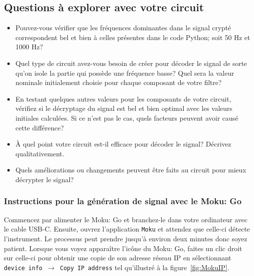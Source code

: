 \documentclass[canadien,12pt,oneside,letterpaper]{article}
\begin{document}
\subsection{Questions à explorer avec votre circuit}
\begin{itemize}
    \item Pouvez-vous vérifier que les fréquences dominantes dans le signal crypté correspondent bel et bien à celles présentes dans le code Python; soit 50 Hz et 1000 Hz?
    \item Quel type de circuit avez-vous besoin de créer pour décoder le signal de sorte qu'on isole la partie qui possède une fréquence basse? Quel sera la valeur nominale initialement choisie pour chaque composant de votre filtre? 
    \item En testant quelques autres valeurs pour les composants de votre circuit, vérifiez si le décryptage du signal est bel et bien optimal avec les valeurs initiales calculées. Si ce n'est pas le cas, quels facteurs peuvent avoir causé cette différence?
    \item À quel point votre circuit est-il efficace pour décoder le signal? Décrivez qualitativement. 
    \item Quels améliorations ou changements peuvent être faits au circuit pour mieux décrypter le signal?
\end{itemize}

\subsubsection{Instructions pour la génération de signal avec le Moku: Go}
Commencez par alimenter le Moku: Go et branchez-le dans votre ordinateur avec le cable USB-C. Ensuite, ouvrez l'application \texttt{Moku} et attendez que celle-ci détecte l'instrument. Le processus peut prendre jusqu'à environ deux minutes donc soyez patient. Lorsque vous voyez apparaître l'icône du Moku: Go, faites un clic droit sur celle-ci pour obtenir une copie de son adresse réseau IP en sélectionnant \texttt{device info $\rightarrow$ Copy IP address} tel qu'illustré à la figure~\ref{fig:MokuIP}.
\end{document}

